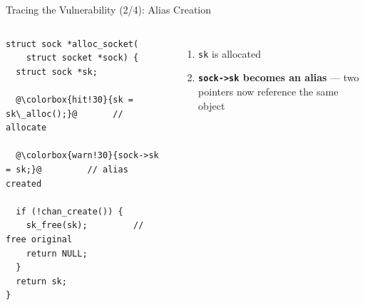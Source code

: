 \documentclass[aspectratio=169,10pt]{beamer}
\begin{document}
\begin{frame}[fragile]{Tracing the Vulnerability (2/4): Alias Creation}
  \begin{columns}
    \begin{tcolorbox}[colback=c1!3, colframe=c1!40!black, boxrule=0.5pt,
      left=4pt, right=4pt, top=4pt, bottom=4pt, arc=3pt,
      shadow={0.5mm}{-0.5mm}{0mm}{black!15}]
    \begin{lstlisting}[style=ccode, basicstyle=\ttfamily\scriptsize\color{black!80},
      keywordstyle=\color{c4}\bfseries, commentstyle=\color{c1!70!black}\itshape,
      stringstyle=\color{c6}, escapechar=@]
struct sock *alloc_socket(
    struct socket *sock) {
  struct sock *sk;

  @\colorbox{hit!30}{sk = sk\_alloc();}@       // allocate

  @\colorbox{warn!30}{sock->sk = sk;}@         // alias created

  if (!chan_create()) {
    sk_free(sk);         // free original
    return NULL;
  }
  return sk;
}
    \end{lstlisting}
    \end{tcolorbox}

    \begin{enumerate}
      \item[\faCheckCircle] \texttt{sk} is allocated
      \item[\faCheckCircle] \textbf{\texttt{sock->sk} becomes an alias} — two pointers now reference the same object
    \end{enumerate}
  \end{columns}
\end{frame}
\end{document}
